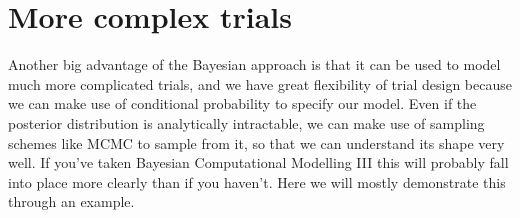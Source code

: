 \documentclass[
  openany]{book}
\theoremstyle{definition}
\theoremstyle{definition}
\theoremstyle{definition}
\theoremstyle{definition}
\theoremstyle{remark}
\begin{document}
\section{More complex trials}\label{more-complex-trials}

Another big advantage of the Bayesian approach is that it can be used to model much more complicated trials, and we have great flexibility of trial design because we can make use of conditional probability to specify our model. Even if the posterior distribution is analytically intractable, we can make use of sampling schemes like MCMC to sample from it, so that we can understand its shape very well. If you've taken Bayesian Computational Modelling III this will probably fall into place more clearly than if you haven't. Here we will mostly demonstrate this through an example.
\end{document}
